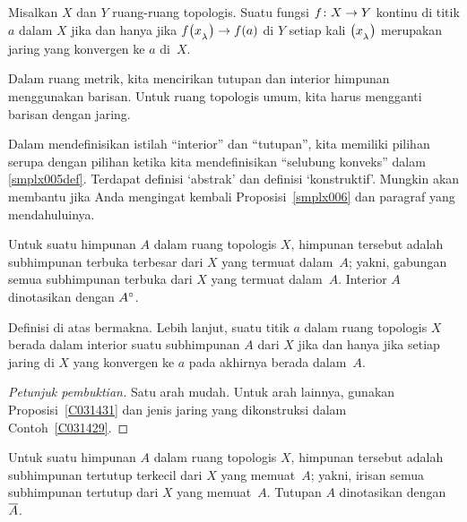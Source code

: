 \begin{prop}\label{C031471} Misalkan $X$ dan $Y$ ruang-ruang topologis. Suatu fungsi
$f\colon X \rightarrow Y$ kontinu di titik $a$ dalam $X$ jika dan hanya jika $f\bigl(x_{{}_{\scriptstyle{\lambda}}}\bigr) \rightarrow f(a)$ di $Y$
setiap kali $\bigl(x_{{}_{\scriptstyle{\lambda}}}\bigr)$ merupakan jaring yang konvergen ke $a$ di~$X$.
\end{prop}

Dalam ruang metrik, kita mencirikan tutupan dan interior himpunan menggunakan barisan. Untuk
ruang topologis umum, kita harus mengganti barisan dengan jaring.

Dalam mendefinisikan istilah ``interior'' dan ``tutupan'', kita memiliki pilihan serupa dengan pilihan ketika kita mendefinisikan ``selubung konveks'' dalam
\ref{smplx005def}. Terdapat definisi `abstrak' dan definisi `konstruktif'. Mungkin akan membantu jika Anda mengingat kembali
Proposisi~\ref{smplx006} dan paragraf yang mendahuluinya.

\begin{defn}\label{def_interior} Untuk suatu himpunan $A$ dalam ruang topologis $X$,
 himpunan tersebut adalah subhimpunan terbuka terbesar dari $X$ yang termuat dalam~$A$; yakni,
gabungan semua subhimpunan terbuka dari $X$ yang termuat dalam~$A$. Interior $A$
dinotasikan dengan ${A}^{\circ}$.
\end{defn}

\begin{prop} Definisi di atas bermakna. Lebih lanjut, suatu titik $a$ dalam ruang topologis $X$ berada dalam interior suatu subhimpunan
$A$ dari $X$ jika dan hanya jika setiap jaring di $X$ yang konvergen ke $a$ pada akhirnya berada dalam~$A$.
\end{prop}

\begin{proof}[\emph{Petunjuk pembuktian}] Satu arah mudah. Untuk arah lainnya, gunakan Proposisi~\ref{C031431} dan jenis
jaring yang dikonstruksi dalam Contoh~\ref{C031429}. \ns
\end{proof}

\begin{defn}\label{def_closure} Untuk suatu himpunan $A$ dalam ruang topologis $X$,
 himpunan tersebut adalah subhimpunan tertutup terkecil dari $X$ yang memuat~$A$; yakni,
irisan semua subhimpunan tertutup dari $X$ yang memuat~$A$. Tutupan $A$
dinotasikan dengan~$\overline{A}$.
\end{defn}

